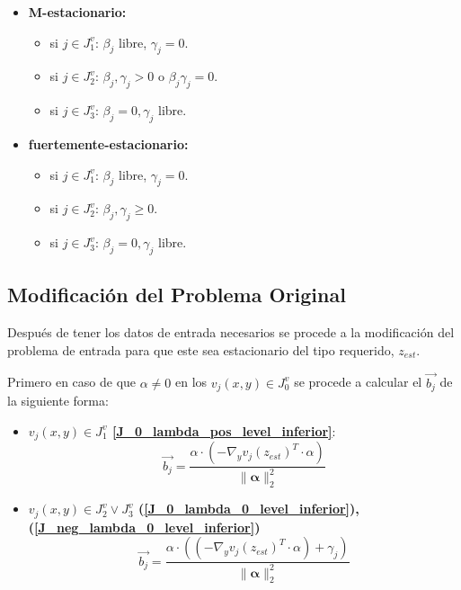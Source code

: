 \begin{itemize}
\item[]\begin{center} {\textbf{ M-estacionario:}} \end{center}\begin{itemize}\item si $j\in J_1^v$: $\beta_j$ libre, $\gamma_j=0$.\item si $j\in J_2^v$: $\beta_j,\gamma_j> 0$ o $\beta_j\gamma_j=0$.\item si $j\in J_3^v$: $\beta_j=0,\gamma_j$ libre.\end{itemize}
\item[]\begin{center} {\textbf{fuertemente-estacionario:}} \end{center}\begin{itemize}\item si $j\in J_1^v$: $\beta_j$ libre, $\gamma_j=0$.\item si $j\in J_2^v$: $\beta_j,\gamma_j\geq 0$.\item si $j\in J_3^v$: $\beta_j=0,\gamma_j$ libre.
\end{itemize}
\end{itemize}




\subsection{Modificación del Problema Original}
Después de tener los datos de entrada necesarios se procede a la modificación
del problema de entrada para que este sea estacionario del tipo requerido, $z_{est}$.

%
Primero en caso de que $\alpha \neq 0$ en los $v_j(x,y) \in J_0^v$ se procede a calcular el $\vec{b_j}$ de la siguiente forma:

\begin{itemize}
    \item \textbf{ $v_j(x,y) \in J_1^v$ \ref{J_0_lambda_pos_level_inferior}}:
        \begin{equation}
            \vec{b_j}=  \frac{{\alpha} \cdot (-\nabla_{y}{v_j(z_{est})}^T \cdot \alpha)}{\|\mathbf{\alpha} \|_2^2}
        \end{equation}
    \item \textbf{$v_j(x,y) \in J_2^v \lor J_3^v$ (\ref{J_0_lambda_0_level_inferior}), (\ref{J_neg_lambda_0_level_inferior})}\\
    \begin{equation}
        \vec{b_j}=  \frac{{\alpha} \cdot ((-\nabla_{y}{v_j(z_{est})}^T \cdot \alpha)+\gamma_j)}{\|\mathbf{\alpha} \|_2^2}
    \end{equation}
\end{itemize}

